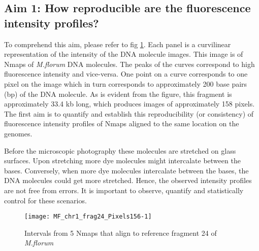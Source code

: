 \documentclass[11pt]{extarticle} %
\begin{document}
\subsection*{Aim 1: How reproducible are the fluorescence intensity profiles?}
To comprehend this aim, please refer to fig \ref{fig:Fig1}. Each panel is a curvilinear representation of the intensity of the DNA molecule images. This image is of Nmaps of {\emph{M.florum}} DNA molecules. The peaks of the curves correspond to high fluorescence intensity and vice-versa. One point on a curve corresponds to one pixel on the image which in turn corresponds to approximately 200 base pairs (bp) of the DNA molecule. As is evident from the figure, this fragment is approximately 33.4 kb long, which produces images of approximately 158 pixels. The first aim is to quantify and establish this reproducibility (or consistency) of fluorescence intensity profiles of Nmaps aligned to the same location on the genomes. 

Before the microscopic photography these molecules are stretched on glass surfaces. Upon stretching more dye molecules might intercalate between the bases. Conversely, when more dye molecules intercalate between the bases, the DNA molecules could get more stretched. Hence, the observed intensity profiles are not free from errors. It is important to observe, quantify and statistically control for these scenarios.

\begin{figure}[H]
	\centering
	\texttt{[image: MF\_chr1\_frag24\_Pixels156-1]}
	\caption{Intervals from 5 Nmaps that align to reference fragment 24 of {\emph{M.florum}}}
	\label{fig:Fig1}
\end{figure}
\end{document}
